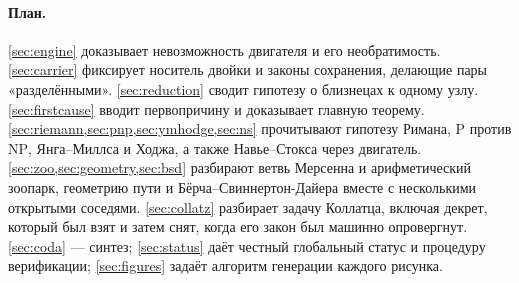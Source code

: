 \paragraph{План.}
\cref{sec:engine} доказывает невозможность двигателя и его необратимость. \cref{sec:carrier}
фиксирует носитель двойки и законы сохранения, делающие пары «разделёнными». \cref{sec:reduction}
сводит гипотезу о близнецах к одному узлу. \cref{sec:firstcause} вводит первопричину и доказывает
главную теорему. \cref{sec:riemann,sec:pnp,sec:ymhodge,sec:ns} прочитывают гипотезу Римана,
$\mathrm{P}$ против $\mathrm{NP}$, Янга--Миллса и Ходжа, а также Навье--Стокса через двигатель.
\cref{sec:zoo,sec:geometry,sec:bsd} разбирают ветвь Мерсенна и арифметический зоопарк, геометрию
пути и Бёрча--Свиннертон-Дайера вместе с несколькими открытыми соседями. \cref{sec:collatz}
разбирает задачу Коллатца, включая декрет, который был взят и затем снят, когда его закон был
машинно опровергнут. \cref{sec:coda} --- синтез; \cref{sec:status} даёт честный глобальный статус
и процедуру верификации; \cref{sec:figures} задаёт алгоритм генерации каждого рисунка.
